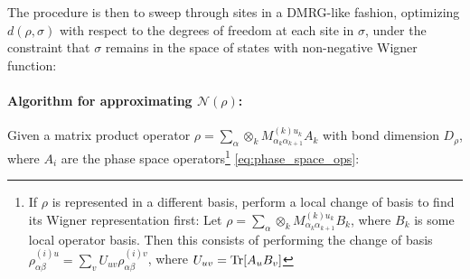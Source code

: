 \documentclass{article}
\begin{document}
The procedure is then to sweep through sites in a DMRG-like fashion, optimizing $d(\rho,\sigma)$ with respect to the degrees of freedom at each site in $\sigma$, under the constraint that $\sigma$ remains in the space of states with non-negative Wigner function:

\paragraph{Algorithm for approximating $\mathcal N(\rho)$:} Given a matrix product operator $\rho=\sum_\alpha \otimes_k M^{(k)u_k}_{\alpha_k\alpha_{k+1}} A_k$ with bond dimension $D_\rho$, where $A_i$ are the phase space operators\footnote{If $\rho$ is represented in a different basis, perform a local change of basis to find its Wigner representation first: Let $\rho=\sum_\alpha \otimes_k M^{(k)u_k}_{\alpha_k\alpha_{k+1}} B_k$, where $B_k$ is some local operator basis. Then this consists of performing the change of basis $\rho^{(i)u}_{\alpha\beta}=\sum_v U_{uv}\rho^{(i)v}_{\alpha\beta}$, where $U_{uv}=\operatorname{Tr}[A_uB_v]$} \eqref{eq:phase_space_ops}:
\end{document}
